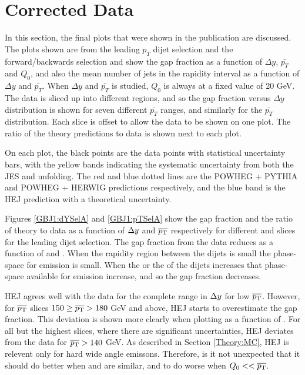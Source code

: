 \section{Corrected Data}
\label{sec:GBJ1:FinalPlots}

In this section, the final plots that were shown in the publication are discussed. 
The plots shown are from  the leading $p_T$ dijet selection and the forward/backwards selection and show the gap fraction as a function of $\Delta y$, $\bar{p_T}$ and $Q_0$, and also the mean number of jets in the rapidity interval as a function of $\Delta y$ and $\bar{p_T}$. 
When $\Delta y$ and $\bar{p_T}$ is studied, $Q_0$ is always at a fixed value of 20 GeV. 
The data is sliced up into different regions, and so the gap fraction versus $\Delta y$ distribution is shown for seven different $\bar{p_T}$ ranges, and similarly for the $\bar{p_T}$ distribution. 
Each slice is offset to allow the data to be shown on one plot. 
The ratio of the theory predictions to data is shown next to each plot.

On each plot, the black points are the data points with statistical uncertainty bars, with the yellow bands indicating the systematic uncertainty from both the JES and unfolding. 
The red and blue dotted lines are the POWHEG + PYTHIA and POWHEG + HERWIG predictions respectively, and the blue band is the HEJ prediction with a theoretical uncertainty.

Figures \ref{GBJ1:dYSelA} and \ref{GBJ1:pTSelA} show the gap fraction and the ratio of theory to data as a function of $\mbox{$\Delta y$}{}$ and $\mbox{$\overline{p_{\rm T}}$}{}$ respectively for different \ptb{} and \dy{} slices for the leading \pt{} dijet selection. 
The gap fraction from the data reduces as a function of \ptb{} and \dy{}.
When the rapidity region between the dijets is small the phase-space for emission is small. 
When the \dy{} or the \ptb{} of the dijets increases that phase-space available for emission increase, and so the gap fraction decreases.

HEJ agrees well with the data for the complete range in $\mbox{$\Delta y$}$ for low $\mbox{$\overline{p_{\rm T}}$}{}$. 
However, for $\mbox{$\overline{p_{\rm T}}$}{}$ slices $150\ge\mbox{$\overline{p_{\rm T}}$}{}>180$ GeV and above, HEJ starts to overestimate the gap fraction.
This deviation is shown more clearly when plotting as a function of \ptb{}.
For all but the highest \dy{} slices, where there are significant uncertainties, HEJ deviates from the data for $\mbox{$\overline{p_{\rm T}}$}{}>140$ GeV.
As described in Section \ref{Theory:MC}, HEJ is relevent only for hard wide angle emissons.
Therefore, is it not unexpected that it should do better when \qz{} and \ptb{} are similar, and to do worse when $Q_{0}<<\mbox{$\overline{p_{\rm T}}$}{}$.

